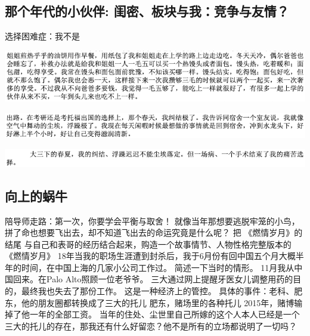 \documentclass[9pt, b5paper]{article}
\begin{document}
\subsection{那个年代的小伙伴: 闺密、板块与我：竞争与友情？}
\label{sec:org6c70161}
选择困难症：我不是
\begin{center}
\includegraphics[width=.9\linewidth]{./pic/backups_plans_20210422_100215.png}
\end{center}
\begin{center}
\includegraphics[width=.9\linewidth]{./pic/backups_plans_20210422_110112.png}
\end{center}
\begin{center}
\includegraphics[width=.9\linewidth]{./pic/backups_plans_20210422_110135.png}
\end{center}
\subsection{向上的蜗牛}
\label{sec:orgb19ea2f}
陪导师走路：第一次，你要学会平衡与取舍！
就像当年那想要逃脱牢笼的小鸟，拼了命也想要飞出去，却不知道飞出去的命运究竟是什么呢？
把 《燃情岁月》的结尾
与自己和表哥的经历结合起来，购造一个故事情节、人物性格完整版本的 《燃情岁月》
18年当我的职场生涯遭到封杀后，我于6月份有回中国五个月大概半年的时间，在中国上海的几家小公司工作过。 简述一下当时的情形。
11月我从中国回来。在Palo Alto照顾一位老爷爷。
三大通过网上提醒牙医女儿调整用药的目的，最终我也失去了那份工作。 
这是一种经济上的管控。
具体的事件：老科、肥东，他的朋友圈都转换成了三大的托儿
肥东，赌场里的各种托儿
2015年，赌博输掉了他一年的全部工资。
当年的住处、尘世里自己所嫁的这个人本人已经是一个三大的托儿的存在，那我还有什么好留恋？他不是所有的立场都说明了一切吗？
\end{document}
